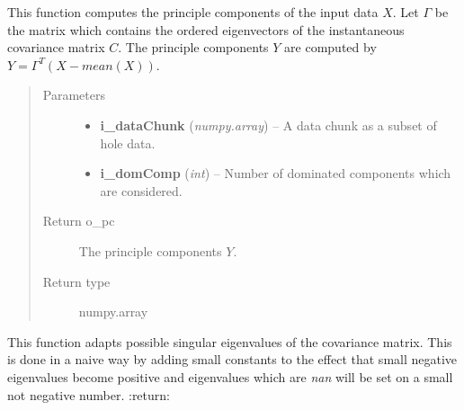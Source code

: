 \documentclass[letterpaper,10pt,english]{sphinxmanual}
\begin{document}
\begin{fulllineitems}
\begin{fulllineitems}
\label{tica:Tica_PrincipleComp.TicaPrinComp.computePCs}
This function computes the principle components of the input data \(X\).
Let \(\Gamma\) be the matrix which contains the ordered eigenvectors of the instantaneous
covariance matrix \(C\). The principle components \(Y\) are computed
by \(Y = \Gamma^{T}(X-mean(X))\).
\begin{quote}\begin{description}
\item[{Parameters}] \leavevmode\begin{itemize}
\item {} 
\textbf{i\_dataChunk} (\emph{numpy.array}) -- A data chunk as a subset of hole data.

\item {} 
\textbf{i\_domComp} (\emph{int}) -- Number of dominated components which are considered.

\end{itemize}

\item[{Return o\_pc}] \leavevmode
The principle components \(Y\).

\item[{Return type}] \leavevmode
numpy.array

\end{description}\end{quote}

\end{fulllineitems}


\begin{fulllineitems}
\label{tica:Tica_PrincipleComp.TicaPrinComp.naiveDampingParamAdapt}
This function adapts possible singular eigenvalues of the covariance matrix.
This is done in a naive way by adding small constants to the effect that small negative eigenvalues
become positive and eigenvalues which are \emph{nan} will be set on a small not negative number.
:return:

\end{fulllineitems}



\end{fulllineitems}
\end{document}
